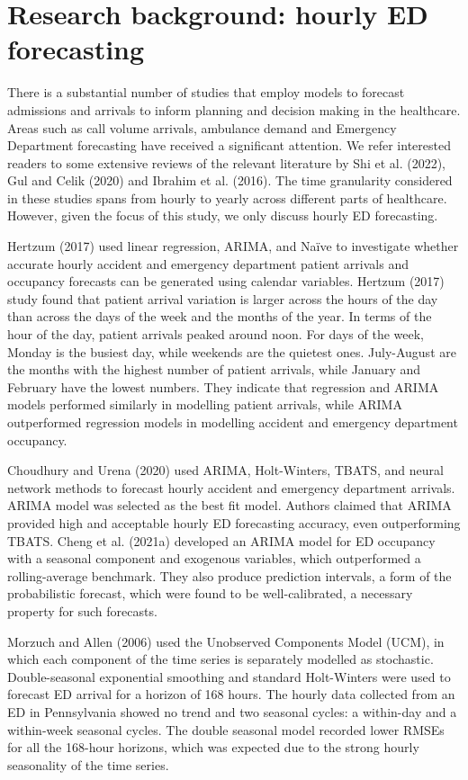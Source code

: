 \documentclass[]{elsarticle} %
\begin{document}
\hypertarget{lit}{%
\section{Research background: hourly ED forecasting}\label{lit}}

There is a substantial number of studies that employ models to forecast admissions and arrivals to inform planning and decision making in the healthcare. Areas such as call volume arrivals, ambulance demand and Emergency Department forecasting have received a significant attention. We refer interested readers to some extensive reviews of the relevant literature by Shi et al. (2022), Gul and Celik (2020) and Ibrahim et al. (2016). The time granularity considered in these studies spans from hourly to yearly across different parts of healthcare. However, given the focus of this study, we only discuss hourly ED forecasting.

Hertzum (2017) used linear regression, ARIMA, and Naïve to
investigate whether accurate hourly accident and emergency department
patient arrivals and occupancy forecasts can be generated using calendar
variables. Hertzum (2017) study found that patient arrival
variation is larger across the hours of the day than across the days of
the week and the months of the year. In terms of the hour of the day,
patient arrivals peaked around noon. For days of the week, Monday is the
busiest day, while weekends are the quietest ones. July-August are the
months with the highest number of patient arrivals, while January and
February have the lowest numbers. They indicate that regression and
ARIMA models performed similarly in modelling patient arrivals, while
ARIMA outperformed regression models in modelling accident and emergency
department occupancy.

Choudhury and Urena (2020) used ARIMA, Holt-Winters, TBATS, and neural
network methods to forecast hourly accident and emergency department
arrivals. ARIMA model was selected as the best fit model. Authors
claimed that ARIMA provided high and acceptable hourly ED forecasting
accuracy, even outperforming TBATS. Cheng et al. (2021a) developed an ARIMA model
for ED occupancy with a seasonal component and exogenous variables,
which outperformed a rolling-average benchmark. They also produce
prediction intervals, a form of the probabilistic forecast, which were
found to be well-calibrated, a necessary property for such forecasts.

Morzuch and Allen (2006) used the Unobserved Components Model (UCM), in
which each component of the time series is separately modelled as
stochastic. Double-seasonal exponential smoothing and standard
Holt-Winters were used to forecast ED arrival for a horizon of 168
hours. The hourly data collected from an ED in Pennsylvania showed no
trend and two seasonal cycles: a within-day and a within-week seasonal
cycles. The double seasonal model recorded lower RMSEs for all the 168-hour horizons, which was expected due to the strong hourly
seasonality of the time series.
\end{document}
